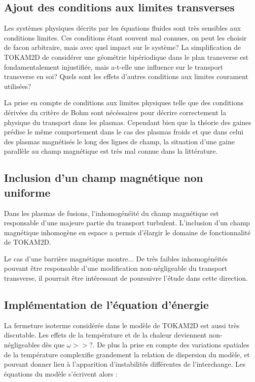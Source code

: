 \begin{refsection}
	\subsection{Ajout des conditions aux limites transverses}
	Les systèmes physiques décrits par les équations fluides sont très sensibles aux conditions limites. Ces conditions étant 
	souvent mal connues, on peut les choisir de facon arbitraire, mais avec quel impact sur le système? La simplification de 
	TOKAM2D de considérer une géométrie bipériodique dans le plan transverse est fondamentalement injustifiée, mais a-t-elle une 
	influence sur le transport transverse en soi? Quels sont les effets d'autres conditions aux limites courament utilisées? 
	
	La prise en compte de conditions aux limites physiques telle que des conditions dérivées du critère de Bohm 
	sont nécéssaires pour décrire correctement la physique du transport dans les plasmas. Cependant bien que la théorie des
	gaines prédise le même comportement dans le cas des plasmas froids et que dans celui des plasmas magnétisés le long des lignes de 
	champ, la situation d'une gaine parallèle au champ magnétique est très mal connue dans la littérature.
	
	\subsection{Inclusion d'un champ magnétique non uniforme}
	Dans les plasmas de fusions, l'inhomogénéité du champ magnétique est responsable d'une majeure partie du transport turbulent.
	L'inclusion d'un champ magnétique inhomogène en espace a permis d'élargir le domaine de fonctionnalité de TOKAM2D. 
	
	Le cas d'une barrière magnétique montre...
	De très faibles inhomogénéités pouvant être responsable d'une modification non-négligeable du transport transverse, il pourrait 
	être intéressant de poursuivre l'étude dans cette direction.
	
	\subsection{Implémentation de l'équation d'énergie}
	La fermeture isoterme considérée dans le modèle de TOKAM2D est aussi très discutable. Les effets de la température et de la chaleur
	deviennent non-négligeables dès que $\omega>>\text{?}$. De plus la prise en compte des variations spatiales de la température
	complexifie grandement la relation de dispersion du modèle, et pouvant donner lieu à l'apparition d'instabilités différentes de 
	l'interchange.
	Les équations du modèle s'écrivent alors :
	

\end{refsection}
